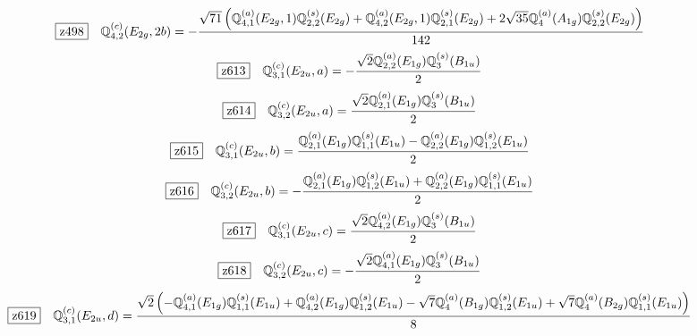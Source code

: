 \documentclass[fleqn,10pt,landscape]{jsarticle}
\begin{document}
\begin{dmath*}
\hspace*{3mm}\fbox{z498}\quad \mathbb{Q}_{4,2}^{(c)}(E_{2g},2b)=- \frac{\sqrt{71} \left(\mathbb{Q}_{4,1}^{(a)}(E_{2g},1) \mathbb{Q}_{2,2}^{(s)}(E_{2g}) + \mathbb{Q}_{4,2}^{(a)}(E_{2g},1) \mathbb{Q}_{2,1}^{(s)}(E_{2g}) + 2 \sqrt{35} \mathbb{Q}_{4}^{(a)}(A_{1g}) \mathbb{Q}_{2,2}^{(s)}(E_{2g})\right)}{142}
\end{dmath*}
\begin{dmath*}
\hspace*{3mm}\fbox{z613}\quad \mathbb{Q}_{3,1}^{(c)}(E_{2u},a)=- \frac{\sqrt{2} \mathbb{Q}_{2,2}^{(a)}(E_{1g}) \mathbb{Q}_{3}^{(s)}(B_{1u})}{2}
\end{dmath*}
\begin{dmath*}
\hspace*{3mm}\fbox{z614}\quad \mathbb{Q}_{3,2}^{(c)}(E_{2u},a)=\frac{\sqrt{2} \mathbb{Q}_{2,1}^{(a)}(E_{1g}) \mathbb{Q}_{3}^{(s)}(B_{1u})}{2}
\end{dmath*}
\begin{dmath*}
\hspace*{3mm}\fbox{z615}\quad \mathbb{Q}_{3,1}^{(c)}(E_{2u},b)=\frac{\mathbb{Q}_{2,1}^{(a)}(E_{1g}) \mathbb{Q}_{1,1}^{(s)}(E_{1u}) - \mathbb{Q}_{2,2}^{(a)}(E_{1g}) \mathbb{Q}_{1,2}^{(s)}(E_{1u})}{2}
\end{dmath*}
\begin{dmath*}
\hspace*{3mm}\fbox{z616}\quad \mathbb{Q}_{3,2}^{(c)}(E_{2u},b)=- \frac{\mathbb{Q}_{2,1}^{(a)}(E_{1g}) \mathbb{Q}_{1,2}^{(s)}(E_{1u}) + \mathbb{Q}_{2,2}^{(a)}(E_{1g}) \mathbb{Q}_{1,1}^{(s)}(E_{1u})}{2}
\end{dmath*}
\begin{dmath*}
\hspace*{3mm}\fbox{z617}\quad \mathbb{Q}_{3,1}^{(c)}(E_{2u},c)=\frac{\sqrt{2} \mathbb{Q}_{4,2}^{(a)}(E_{1g}) \mathbb{Q}_{3}^{(s)}(B_{1u})}{2}
\end{dmath*}
\begin{dmath*}
\hspace*{3mm}\fbox{z618}\quad \mathbb{Q}_{3,2}^{(c)}(E_{2u},c)=- \frac{\sqrt{2} \mathbb{Q}_{4,1}^{(a)}(E_{1g}) \mathbb{Q}_{3}^{(s)}(B_{1u})}{2}
\end{dmath*}
\begin{dmath*}
\hspace*{3mm}\fbox{z619}\quad \mathbb{Q}_{3,1}^{(c)}(E_{2u},d)=\frac{\sqrt{2} \left(- \mathbb{Q}_{4,1}^{(a)}(E_{1g}) \mathbb{Q}_{1,1}^{(s)}(E_{1u}) + \mathbb{Q}_{4,2}^{(a)}(E_{1g}) \mathbb{Q}_{1,2}^{(s)}(E_{1u}) - \sqrt{7} \mathbb{Q}_{4}^{(a)}(B_{1g}) \mathbb{Q}_{1,2}^{(s)}(E_{1u}) + \sqrt{7} \mathbb{Q}_{4}^{(a)}(B_{2g}) \mathbb{Q}_{1,1}^{(s)}(E_{1u})\right)}{8}
\end{dmath*}
\end{document}
